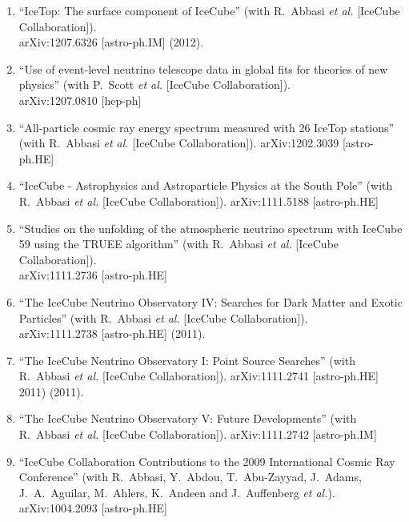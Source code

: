 \begin{enumerate}
\item ``IceTop: The surface component of IceCube'' (with
        R.~Abbasi {\it et   al.}  [IceCube Collaboration]).
        \\{}arXiv:1207.6326 [astro-ph.IM] %
        (2012).

\item ``Use of event-level neutrino telescope data in global
        fits for   theories of new physics'' (with P.~Scott
        {\it et al.}  [IceCube     Collaboration]).
        \\{}arXiv:1207.0810 [hep-ph] %

\item ``All-particle cosmic ray energy spectrum measured
        with 26 IceTop   stations'' (with R.~Abbasi {\it et
        al.}  [IceCube Collaboration]). arXiv:1202.3039
        [astro-ph.HE] %

\item ``IceCube - Astrophysics and Astroparticle Physics at
        the South Pole'' (with R.~Abbasi {\it et al.}
        [IceCube Collaboration]). arXiv:1111.5188
        [astro-ph.HE] %

\item ``Studies on the unfolding of the atmospheric neutrino
        spectrum with   IceCube 59 using the TRUEE
        algorithm'' (with R.~Abbasi {\it et al.}   [IceCube
        Collaboration]).  \\{}arXiv:1111.2736 [astro-ph.HE]

\item ``The IceCube Neutrino Observatory IV: Searches for
        Dark Matter and   Exotic Particles'' (with R.~Abbasi
        {\it et al.}  [IceCube     Collaboration]).
        \\{}arXiv:1111.2738 [astro-ph.HE] %
        (2011).

\item ``The IceCube Neutrino Observatory I: Point Source
        Searches'' (with R.~Abbasi {\it et al.}  [IceCube
        Collaboration]). arXiv:1111.2741 [astro-ph.HE] %
        2011)  (2011).

\item ``The IceCube Neutrino Observatory V: Future
        Developments'' (with R.~Abbasi {\it et al.}
        [IceCube Collaboration]). arXiv:1111.2742
        [astro-ph.IM] %

\item ``IceCube Collaboration Contributions to the 2009
        International Cosmic   Ray Conference'' (with
        R.~Abbasi, Y.~Abdou, T.~Abu-Zayyad, J.~Adams,
        J.~A.~Aguilar, M.~Ahlers, K.~Andeen and
        J.~Auffenberg {\it et al.}). arXiv:1004.2093
        [astro-ph.HE] %


\end{enumerate}
